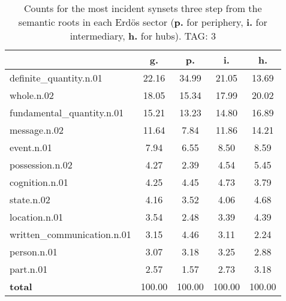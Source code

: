 \begin{table}[h!]
\begin{center}
\begin{tabular}{| l | c | c | c | c |}\hline
 & g. & p. & i. & h. \\\hline
definite\_quantity.n.01 & 22.16  & 34.99  & 21.05  & 13.69 \\\hline
whole.n.02 & 18.05  & 15.34  & 17.99  & 20.02 \\\hline
fundamental\_quantity.n.01 & 15.21  & 13.23  & 14.80  & 16.89 \\\hline
message.n.02 & 11.64  & 7.84  & 11.86  & 14.21 \\\hline
event.n.01 & 7.94  & 6.55  & 8.50  & 8.59 \\\hline
possession.n.02 & 4.27  & 2.39  & 4.54  & 5.45 \\\hline
cognition.n.01 & 4.25  & 4.45  & 4.73  & 3.79 \\\hline
state.n.02 & 4.16  & 3.52  & 4.06  & 4.68 \\\hline
location.n.01 & 3.54  & 2.48  & 3.39  & 4.39 \\\hline
written\_communication.n.01 & 3.15  & 4.46  & 3.11  & 2.24 \\\hline
person.n.01 & 3.07  & 3.18  & 3.25  & 2.88 \\\hline
part.n.01 & 2.57  & 1.57  & 2.73  & 3.18 \\\hline
{{\bf total}} & 100.00  & 100.00  & 100.00  & 100.00 \\\hline
\end{tabular}
\caption{Counts for the most incident synsets three step from the semantic roots in each Erd\"os sector ({\bf p.} for periphery, {\bf i.} for intermediary, {\bf h.} for hubs). TAG: 3}
\end{center}
\end{table}